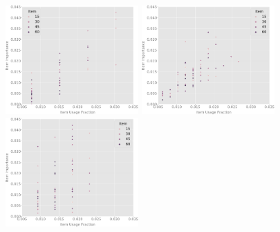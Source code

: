 \documentclass[onecolumn, compsoc,9pt]{IEEEtran}
\begin{document}
\begin{table}

  

\end{table}
\begin{table}

  

\end{table}
\begin{table}

  

\end{table}


\clearpage



\begin{table}
\fontsize{6}{7}\selectfont 
  

\end{table}
\begin{table}

\fontsize{6}{7}\selectfont   

\end{table}
\begin{table}
\fontsize{6}{7}\selectfont  

\end{table}




\begin{figure}
\includegraphics[width=2in]{./SCZSAFF/3IMPFRACsczVscaff_2_}
\includegraphics[width=2in]{./SCZSAFF/6IMPFRACsczVscaff_2_}
\includegraphics[width=2in]{./SCZSAFF/9IMPFRACsczVscaff_2_}
\end{figure}
\end{document}
